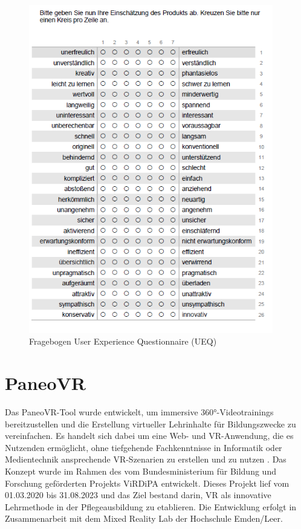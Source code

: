 \begin{figure}[tbh]
    \centering
    \includegraphics[width=0.95\textwidth]{images/UEQ.png}
    \caption{Fragebogen User Experience Questionnaire (UEQ)}
    \label{fig:UEQ}
\end{figure}

\section{PaneoVR}

Das PaneoVR-Tool wurde entwickelt, um immersive 360°-Videotrainings bereitzustellen und die Erstellung virtueller Lehrinhalte für Bildungszwecke zu vereinfachen. Es handelt sich dabei um eine Web- und VR-Anwendung, die es Nutzenden ermöglicht, ohne tiefgehende Fachkenntnisse in Informatik oder Medientechnik ansprechende VR-Szenarien zu erstellen und zu nutzen \citep{noauthor_paneovr_nodate}. Das Konzept wurde im Rahmen des vom Bundesministerium für Bildung und Forschung geförderten Projekts ViRDiPA \citep{noauthor_virdipa-_nodate} entwickelt. Dieses Projekt lief vom 01.03.2020 bis 31.08.2023 und das Ziel bestand darin, VR als innovative Lehrmethode in der Pflegeausbildung zu etablieren. Die Entwicklung erfolgt in Zusammenarbeit mit dem Mixed Reality Lab der Hochschule Emden/Leer.

